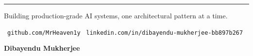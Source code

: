 \documentclass[11pt]{article}
\begin{document}
\vfill
\vspace{0.1in}
\begin{center}
    \rule{0.6\textwidth}{0.5pt}

    \vspace{0.18in}
    
    {\fontsize{11}{13}\selectfont\color{brandgray}
    Building production-grade AI systems, one architectural pattern at a time.
    }

    \vspace{0.18in}

    {\fontsize{10}{12}\selectfont\color{brandgray}
    \faGithub\ \texttt{github.com/MrHeaven1y}
    \hspace{0.45in}
    \faLinkedin\ \texttt{linkedin.com/in/dibayendu-mukherjee-bb897b267}
    }

    \vspace{0.15in}

    {\fontsize{14}{16}\selectfont\color{brandnavy}\textbf{Dibayendu Mukherjee}}

\end{center}

\vspace*{0.3in} 
\end{document}
